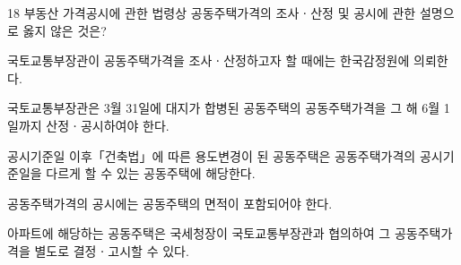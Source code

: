 \begin{question}{18}
부동산 가격공시에 관한 법령상 공동주택가격의 조사ㆍ산정 및 공시에 관한 설명으로 옳지 않은 것은?
\begin{choices}
  \item 국토교통부장관이 공동주택가격을 조사ㆍ산정하고자 할 때에는 한국감정원에 의뢰한다.
  \item 국토교통부장관은 3월 31일에 대지가 합병된 공동주택의 공동주택가격을 그 해 6월 1일까지 산정ㆍ공시하여야 한다.
  \item 공시기준일 이후「건축법」에 따른 용도변경이 된 공동주택은 공동주택가격의 공시기준일을 다르게 할 수 있는 공동주택에 해당한다.
  \item 공동주택가격의 공시에는 공동주택의 면적이 포함되어야 한다.
  \item 아파트에 해당하는 공동주택은 국세청장이 국토교통부장관과 협의하여 그 공동주택가격을 별도로 결정ㆍ고시할 수 있다.
\end{choices}
\end{question}
